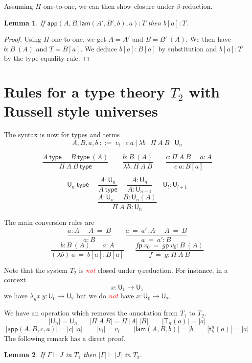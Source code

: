 \documentclass[11pt,a4paper]{article}
\newtheorem{lemma}{Lemma}[theorem]
\theoremstyle{definition}
\newcommand{\conv}{=}
\def\UU{\mathsf{U}}
\newcommand{\type}{\mathsf{type}}
\newcommand{\LAM}{\mathsf{lam}}
\newcommand{\APP}{\mathsf{app}}
\newcommand{\T}{\mathsf{T}}
\newcommand{\sT}{\mathsf{t}}
\newcommand{\pp}{\mathsf{p}}
\newcommand{\EMP}[1]{\emph{\textcolor{red}{#1}}}
\begin{document}
Assuming $\Pi$ one-to-one, we can then show closure under $\beta$-reduction.

\begin{lemma}
  If $\APP(A,B,\LAM(A',B',b),a):T$ then $b[a]:T$.
\end{lemma}

\begin{proof}
  Using $\Pi$ one-to-one, we get $A=A'$ and $B=B'~(A)$. We then have $b:B~(A)$ and $T = B[a]$.
  We deduce $b[a]:B[a]$ by substitution and $b[a]:T$ by the type equality rule.
\end{proof}

\section{Rules for a type theory $T_2$ with Russell style universes}

The syntax is now for types and terms
$$
A,B,a,b~::=~v_i~|~c~a~|~\lambda b~|~\Pi~{A}~B~|~\UU_n
$$

$$
\frac{A~\type~~~~~~B~\type~(A)}{\Pi~A~B~\type}~~~~~~~~~
\frac{b:B~(A)}{\lambda b:\Pi~A~B}~~~~~~~~
\frac{c:\Pi~A~B~~~~~~a:A}
     {c~a:B[a]}
$$

$$
\UU_n~\type~~~~~~
\frac{A:\UU_{n}}{A~\type}
~~~~~~\frac{A:\UU_{n}}{A:\UU_{n+1}}
~~~~~~~
{\UU_l}:\UU_{l+1}
$$
$$
\frac{A:\UU_{n}~~~~~~B:\UU_n(A)}
     {\Pi~A~B:\UU_{n}}$$

The main conversion rules are
$$
\frac{ a:A~~~~~~ A~ \conv~ B}{ a:B}~~~~~~~~~
\frac{ a ~\conv~a':A~~~~~~ A  ~\conv~ B}{ a ~\conv~a':B}
$$
$$
\frac{b:B~(A)~~~~~~~~ a:A}{ (\lambda b)~a  ~\conv~ b[a]:B[a]}
~~~~~~~
\frac{f\pp~v_0 ~\conv~ g\pp~v_0:B~(A)}{ f ~\conv~ g : \Pi~A~B}
$$



\medskip

     Note that the system $T_2$ is \EMP{not} closed under $\eta$-reduction. For instance, in a context
     $$x:\UU_1\rightarrow\UU_1$$
     we have $\lambda_yx~y:\UU_0\rightarrow\UU_2$ but we do \EMP{not} have
     $x:\UU_0\rightarrow\UU_2$.


\medskip

We have an operation which removes the annotation from $T_1$ to $T_2$.
$$
|\UU_n| = \UU_n~~~~~~~~|\Pi~A~B| = \Pi~|A|~|B|~~~~~~~~~|\T_n(a)| = |a|
$$
$$
|\APP(A,B,c,a)| = |c|~|a|~~~~~~~~~|v_i| = v_i~~~~~~~~~|\LAM(A,B,b)| = |b|~~~~~~~~|\sT_k^n(a)| = |a|
$$
The following remark has a direct proof.

\begin{lemma}
  If $\Gamma\vdash J$ in $T_1$ then $|\Gamma|\vdash |J|$ in $T_2$.
\end{lemma}
\end{document}

